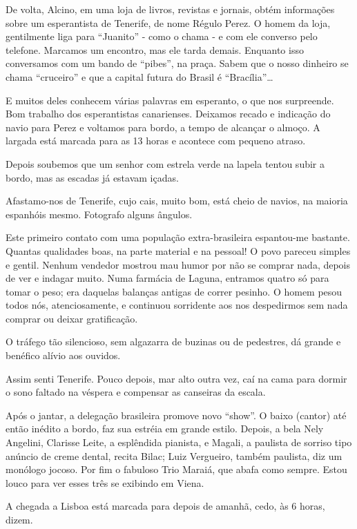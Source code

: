 De volta, Alcino, em uma loja de livros, revistas e jornais, obtém informações sobre um esperantista de Tenerife, de nome Régulo Perez. O homem da loja, gentilmente liga para “Juanito” - como o chama - e com ele converso pelo telefone. Marcamos um encontro, mas ele tarda demais. Enquanto isso conversamos com um bando de “pibes”, na praça. Sabem que o nosso dinheiro se chama “cruceiro” e que a capital futura do Brasil é “Bracília”\ldots

E muitos deles conhecem várias palavras em esperanto, o que nos surpreende. Bom trabalho dos esperantistas canarienses. Deixamos recado e indicação do navio para Perez e voltamos para bordo, a tempo de alcançar o almoço. A largada está marcada para as 13 horas e acontece com pequeno atraso.

Depois soubemos que um senhor com estrela verde na lapela tentou subir a bordo, mas as escadas já estavam içadas.

Afastamo-nos de Tenerife, cujo cais, muito bom, está cheio de navios, na maioria espanhóis mesmo. Fotografo alguns ângulos.

Este primeiro contato com uma população extra-brasileira espantou-me bastante. Quantas qualidades boas, na parte material e na pessoal! O povo pareceu simples e gentil. Nenhum vendedor mostrou mau humor por não se comprar nada, depois de ver e indagar muito. Numa farmácia de Laguna, entramos quatro só para tomar o peso; era daquelas balanças antigas de correr pesinho. O homem pesou todos nós, atenciosamente, e continuou sorridente aos nos despedirmos sem nada comprar ou deixar gratificação.

O tráfego tão silencioso, sem algazarra de buzinas ou de pedestres, dá grande e benéfico alívio aos ouvidos.

Assim senti Tenerife. Pouco depois, mar alto outra vez, caí na cama para dormir o sono faltado na véspera e compensar as canseiras da escala.

Após o jantar, a delegação brasileira promove novo “show”. O baixo (cantor) até então inédito a bordo, faz sua estréia em grande estilo. Depois, a bela Nely Angelini, Clarisse Leite, a esplêndida pianista, e Magali, a paulista de sorriso tipo anúncio de creme dental, recita Bilac; Luiz Vergueiro, também paulista, diz um monólogo jocoso. Por fim o fabuloso Trio Maraiá, que abafa como sempre. Estou louco para ver esses três se exibindo em Viena.

A chegada a Lisboa está marcada para depois de amanhã, cedo, às 6 horas, dizem.

